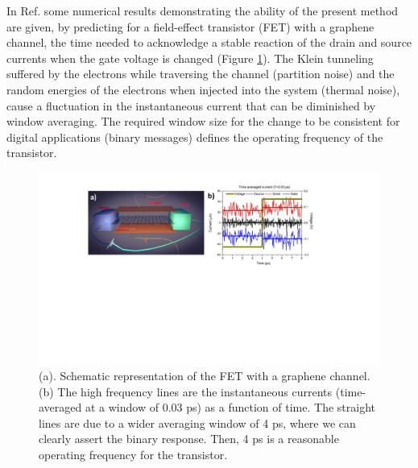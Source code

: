 \documentclass[11pt, a4paper]{article} %
\begin{document}
In Ref. \cite{Thz} some numerical results demonstrating the ability of the present method are given, by predicting for a field-effect transistor (FET) with a graphene channel, the time needed to acknowledge a stable reaction of the drain and source currents when the gate voltage is changed (Figure \ref{fig:fig}). The Klein tunneling suffered by the electrons while traversing the channel (partition noise) and the random energies of the electrons when injected into the system (thermal noise), cause a fluctuation in the instantaneous current that can be diminished by window averaging. The required window size for the change to be consistent for digital applications (binary messages) defines the operating frequency of the transistor.\vspace{-0.2cm}
\begin{figure}[h!]
  \centering
  \hspace*{-0.5cm}
   \includegraphics[width=1.05\linewidth]{Figures/figurefinal.pdf}\vspace{-0.3cm}
   \caption{(a). Schematic representation of the FET with a graphene channel. (b) The high frequency lines are the instantaneous currents (time-averaged at a window of $0.03$ ps) as a function of time. The straight lines are due to a wider averaging window of 4 ps, where we can clearly assert the binary response. Then, 4 ps is a reasonable operating frequency for the transistor.}\vspace{-0.5cm}
  \label{fig:fig}
\end{figure}
\end{document}
